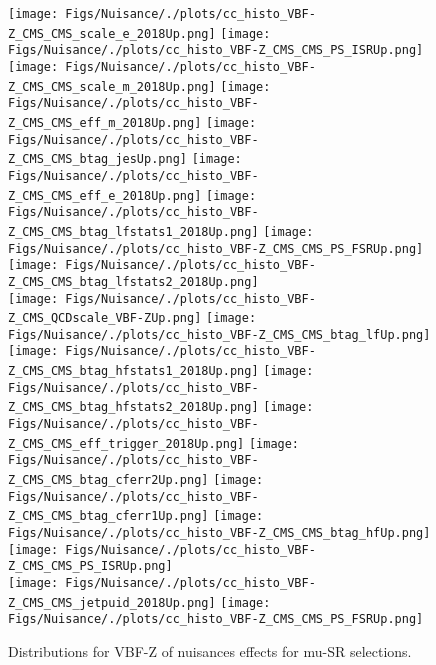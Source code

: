 \begin{figure*}[htbp]  
\centering 
\texttt{[image: Figs/Nuisance/./plots/cc\_histo\_VBF-Z\_CMS\_CMS\_scale\_e\_2018Up.png]}
\texttt{[image: Figs/Nuisance/./plots/cc\_histo\_VBF-Z\_CMS\_CMS\_PS\_ISRUp.png]}
\texttt{[image: Figs/Nuisance/./plots/cc\_histo\_VBF-Z\_CMS\_CMS\_scale\_m\_2018Up.png]}
\texttt{[image: Figs/Nuisance/./plots/cc\_histo\_VBF-Z\_CMS\_CMS\_eff\_m\_2018Up.png]}
\texttt{[image: Figs/Nuisance/./plots/cc\_histo\_VBF-Z\_CMS\_CMS\_btag\_jesUp.png]}
\texttt{[image: Figs/Nuisance/./plots/cc\_histo\_VBF-Z\_CMS\_CMS\_eff\_e\_2018Up.png]}
\texttt{[image: Figs/Nuisance/./plots/cc\_histo\_VBF-Z\_CMS\_CMS\_btag\_lfstats1\_2018Up.png]}
\texttt{[image: Figs/Nuisance/./plots/cc\_histo\_VBF-Z\_CMS\_CMS\_PS\_FSRUp.png]}
\texttt{[image: Figs/Nuisance/./plots/cc\_histo\_VBF-Z\_CMS\_CMS\_btag\_lfstats2\_2018Up.png]}\\
\texttt{[image: Figs/Nuisance/./plots/cc\_histo\_VBF-Z\_CMS\_QCDscale\_VBF-ZUp.png]}
\texttt{[image: Figs/Nuisance/./plots/cc\_histo\_VBF-Z\_CMS\_CMS\_btag\_lfUp.png]}
\texttt{[image: Figs/Nuisance/./plots/cc\_histo\_VBF-Z\_CMS\_CMS\_btag\_hfstats1\_2018Up.png]}
\texttt{[image: Figs/Nuisance/./plots/cc\_histo\_VBF-Z\_CMS\_CMS\_btag\_hfstats2\_2018Up.png]}
\texttt{[image: Figs/Nuisance/./plots/cc\_histo\_VBF-Z\_CMS\_CMS\_eff\_trigger\_2018Up.png]}
\texttt{[image: Figs/Nuisance/./plots/cc\_histo\_VBF-Z\_CMS\_CMS\_btag\_cferr2Up.png]}
\texttt{[image: Figs/Nuisance/./plots/cc\_histo\_VBF-Z\_CMS\_CMS\_btag\_cferr1Up.png]}
\texttt{[image: Figs/Nuisance/./plots/cc\_histo\_VBF-Z\_CMS\_CMS\_btag\_hfUp.png]}
\texttt{[image: Figs/Nuisance/./plots/cc\_histo\_VBF-Z\_CMS\_CMS\_PS\_ISRUp.png]}\\
\texttt{[image: Figs/Nuisance/./plots/cc\_histo\_VBF-Z\_CMS\_CMS\_jetpuid\_2018Up.png]}
\texttt{[image: Figs/Nuisance/./plots/cc\_histo\_VBF-Z\_CMS\_CMS\_PS\_FSRUp.png]}
\\ 
\caption{ 
   Distributions for VBF-Z of nuisances effects for mu-SR selections.
} 
\label{fig:VBF-Z_mu_SR} 
\end{figure*} 




